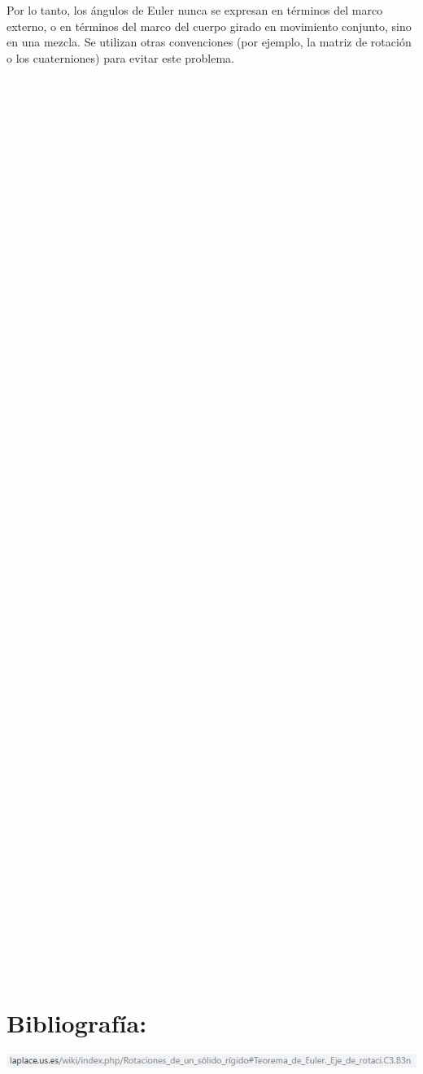 \documentclass[12pt,a4paper]{article}
\begin{document}
Por lo tanto, los ángulos de Euler nunca se expresan en términos del marco externo, o en términos del marco del cuerpo girado en movimiento conjunto, sino en una mezcla. Se utilizan otras convenciones (por ejemplo, la matriz de rotación o los cuaterniones) para evitar este problema.\\\\\\\\\\\\\\\\\\\\\\\\\\\\\\\\\\\\\\\\\\\\\\\\\\\\\\\\\\\\\\\\\\\\\\\\\\\\\\\\\\\\\\\\\\\\\\\\\\\\\\\\\\\\\\\\\\\

\section{Bibliografía:}

\includegraphics[scale=1]{bib.PNG} 
\end{document}

